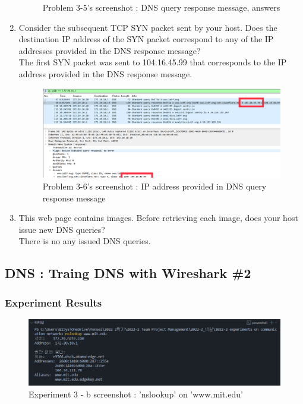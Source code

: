 \begin{enumerate}[label=\bfseries Problem \arabic*:,leftmargin=*,labelindent=1em]
\begin{figure}[!h]
        		\caption{\footnotesize Problem 3-5's screenshot : DNS query response message, answers}
        		\vspace{-10pt}
            \end{figure}
        \item Consider the subsequent TCP SYN packet sent by your host.
        Does the destination IP address of the SYN packet correspond to any of the IP addresses 
        provided in the DNS response message?\\[0.2mm]
            \soln The first SYN packet was sent to 104.16.45.99 that corresponds to the IP address provided in the DNS response message.
            \vspace{-2mm}  
            \begin{figure}[!h]\centering
        		\includegraphics[width=.78\textwidth]{image/result_week01/Q3-6.png}
        		\caption{\footnotesize Problem 3-6's screenshot : IP address provided in DNS query response message}
        		\vspace{-10pt}
            \end{figure}
        \item This web page contains images. Before retrieving each image, 
        does your host issue new DNS queries?\\[0.2mm]
            \soln There is no any issued DNS queries.
    \end{enumerate}
\subsection{DNS : Traing DNS with Wireshark \#2}
    \subsubsection*{Experiment Results}
        \vspace{-2mm}  
        \begin{figure}[!h]\centering
    		\includegraphics[width=.78\textwidth]{image/result_week01/Q3-8-0.png}
    		\caption{\footnotesize Experiment 3 - b screenshot : 'nslookup' on 'www.mit.edu'}
    		\vspace{-10pt}
        \end{figure}
\clearpage
